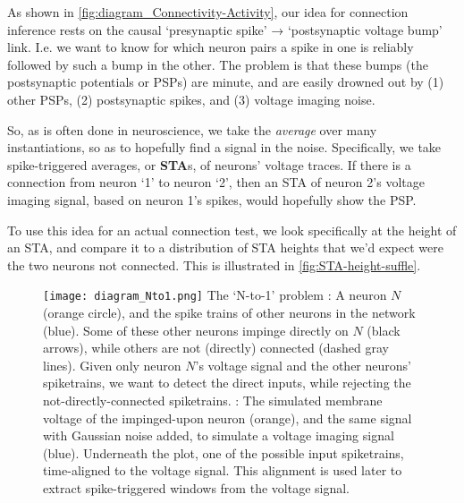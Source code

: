 
As shown in \cref{fig:diagram_Connectivity-Activity}, our idea for connection inference rests on the causal `presynaptic spike' → `postsynaptic voltage bump' link. I.e. we want to know for which neuron pairs a spike in one is reliably followed by such a bump in the other. The problem is that these bumps (the postsynaptic potentials or PSPs) are minute, and are easily drowned out by (1) other PSPs, (2) postsynaptic spikes, and (3) voltage imaging noise.

So, as is often done in neuroscience, we take the \emph{average} over many instantiations, so as to hopefully find a signal in the noise. Specifically, we take spike-triggered averages, or \textbf{STA}s, of neurons' voltage traces. If there is a connection from neuron `1' to neuron `2', then an STA of neuron 2's voltage imaging signal, based on neuron 1's spikes, would hopefully show the PSP.

To use this idea for an actual connection test, we look specifically at the height of an STA, and compare it to a distribution of STA heights that we'd expect were the two neurons not connected. This is illustrated in \cref{fig:STA-height-suffle}.


\begin{figure}
    \vspace*{2em}
    \hspace{2em}%
    \texttt{[image: diagram\_Nto1.png]}
    \vspace*{-1.4em}
    \captionn
        {The `N-to-1' problem}
        {\Left: A neuron $N$ (orange circle), and the spike trains of other neurons in the network (blue). Some of these other neurons impinge directly on $N$ (black arrows), while others are not (directly) connected (dashed gray lines). Given only neuron $N$'s voltage signal and the other neurons' spiketrains, we want to detect the direct inputs, while rejecting the not-directly-connected spiketrains.\newline
        \Right: The simulated membrane voltage of the impinged-upon neuron (orange), and the same signal with Gaussian noise added, to simulate a voltage imaging signal (blue). Underneath the plot, one of the possible input spiketrains, time-aligned to the voltage signal.
        This alignment is used later to extract spike-triggered windows from the voltage signal.}
    \label{fig:diagram_Nto1}
\end{figure}

